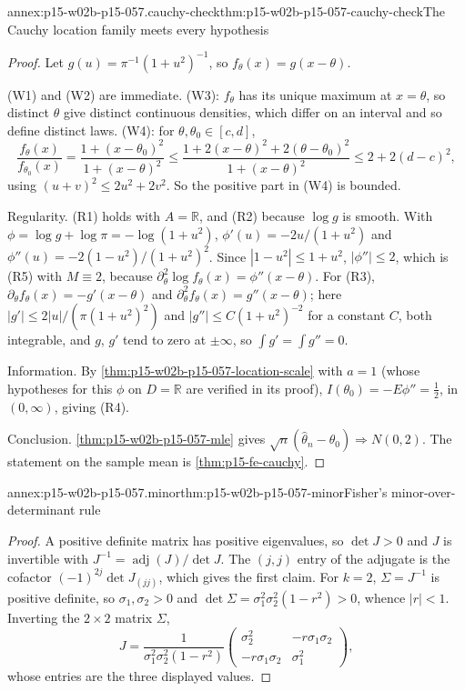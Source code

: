 \begin{annexitem}{annex:p15-w02b-p15-057.cauchy-check}{thm:p15-w02b-p15-057-cauchy-check}{The Cauchy location family meets every hypothesis}
\begin{proof}
Let \(g(u)=\pi^{-1}(1+u^2)^{-1}\), so \(f_\theta(x)=g(x-\theta)\).

(W1) and (W2) are immediate. (W3): \(f_\theta\) has its unique maximum at
\(x=\theta\), so distinct \(\theta\) give distinct continuous densities,
which differ on an interval and so define distinct laws. (W4): for
\(\theta,\theta_0\in[c,d]\),
\[
 \frac{f_\theta(x)}{f_{\theta_0}(x)}=\frac{1+(x-\theta_0)^2}{1+(x-\theta)^2}
 \leq\frac{1+2(x-\theta)^2+2(\theta-\theta_0)^2}{1+(x-\theta)^2}
 \leq2+2(d-c)^2,
\]
using \((u+v)^2\leq2u^2+2v^2\). So the positive part in (W4) is bounded.

Regularity. (R1) holds with \(A=\mathbb R\), and (R2) because \(\log g\)
is smooth. With \(\phi=\log g+\log\pi=-\log(1+u^2)\),
\(\phi'(u)=-2u/(1+u^2)\) and \(\phi''(u)=-2(1-u^2)/(1+u^2)^2\). Since
\(|1-u^2|\leq1+u^2\), \(|\phi''|\leq2\), which is (R5) with \(M\equiv2\),
because \(\partial_\theta^2\log f_\theta(x)=\phi''(x-\theta)\). For (R3),
\(\partial_\theta f_\theta(x)=-g'(x-\theta)\) and
\(\partial_\theta^2f_\theta(x)=g''(x-\theta)\); here
\(|g'|\leq2|u|/(\pi(1+u^2)^2)\) and \(|g''|\leq C(1+u^2)^{-2}\) for a
constant \(C\), both integrable, and \(g\), \(g'\) tend to zero at
\(\pm\infty\), so \(\int g'=\int g''=0\).

Information. By \cref{thm:p15-w02b-p15-057-location-scale} with \(a=1\)
(whose hypotheses for this \(\phi\) on \(D=\mathbb R\) are verified in its
proof), \(I(\theta_0)=-E\phi''=\tfrac12\), in \((0,\infty)\), giving (R4).

Conclusion. \cref{thm:p15-w02b-p15-057-mle} gives
\(\sqrt n(\widehat\theta_n-\theta_0)\Rightarrow N(0,2)\). The statement on
the sample mean is \cref{thm:p15-fe-cauchy}.
\end{proof}
\end{annexitem}

\begin{annexitem}{annex:p15-w02b-p15-057.minor}{thm:p15-w02b-p15-057-minor}{Fisher's minor-over-determinant rule}
\begin{proof}
A positive definite matrix has positive eigenvalues, so \(\det J>0\) and
\(J\) is invertible with \(J^{-1}=\operatorname{adj}(J)/\det J\). The
\((j,j)\) entry of the adjugate is the cofactor \((-1)^{2j}\det J_{(jj)}\),
which gives the first claim. For \(k=2\), \(\Sigma=J^{-1}\) is positive
definite, so \(\sigma_1,\sigma_2>0\) and
\(\det\Sigma=\sigma_1^2\sigma_2^2(1-r^2)>0\), whence \(|r|<1\). Inverting
the \(2\times2\) matrix \(\Sigma\),
\[
 J=\frac1{\sigma_1^2\sigma_2^2(1-r^2)}
 \begin{pmatrix}\sigma_2^2&-r\sigma_1\sigma_2\\
 -r\sigma_1\sigma_2&\sigma_1^2\end{pmatrix},
\]
whose entries are the three displayed values.
\end{proof}
\end{annexitem}

